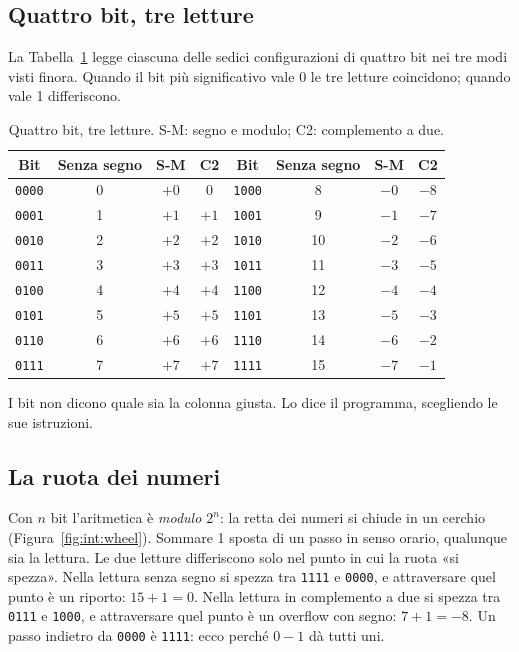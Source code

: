 \subsection{Quattro bit, tre letture}

La Tabella~\ref{tab:int:readings} legge ciascuna delle sedici configurazioni di
quattro bit nei tre modi visti finora. Quando il bit più significativo vale 0
le tre letture coincidono; quando vale 1 differiscono.

\begin{table}[htb]
\centering\small
\caption{Quattro bit, tre letture. S-M: segno e modulo; C2: complemento a due.}\label{tab:int:readings}
\begin{tabular}{@{}cccc@{\qquad}cccc@{}}
\toprule
\textbf{Bit} & \textbf{Senza segno} & \textbf{S-M} & \textbf{C2} &
\textbf{Bit} & \textbf{Senza segno} & \textbf{S-M} & \textbf{C2}\\
\midrule
\texttt{0000} & 0 & $+0$ & 0 & \texttt{1000} & 8 & $-0$ & $-8$\\
\texttt{0001} & 1 & $+1$ & $+1$ & \texttt{1001} & 9 & $-1$ & $-7$\\
\texttt{0010} & 2 & $+2$ & $+2$ & \texttt{1010} & 10 & $-2$ & $-6$\\
\texttt{0011} & 3 & $+3$ & $+3$ & \texttt{1011} & 11 & $-3$ & $-5$\\
\texttt{0100} & 4 & $+4$ & $+4$ & \texttt{1100} & 12 & $-4$ & $-4$\\
\texttt{0101} & 5 & $+5$ & $+5$ & \texttt{1101} & 13 & $-5$ & $-3$\\
\texttt{0110} & 6 & $+6$ & $+6$ & \texttt{1110} & 14 & $-6$ & $-2$\\
\texttt{0111} & 7 & $+7$ & $+7$ & \texttt{1111} & 15 & $-7$ & $-1$\\
\bottomrule
\end{tabular}
\end{table}

\begin{prgconcept}
I bit non dicono quale sia la colonna giusta. Lo dice il programma, scegliendo
le sue istruzioni.
\end{prgconcept}

\subsection{La ruota dei numeri}

Con $n$ bit l'aritmetica è \emph{modulo $2^{n}$}: la retta dei numeri si chiude
in un cerchio (Figura~\ref{fig:int:wheel}). Sommare 1 sposta di un passo in
senso orario, qualunque sia la lettura. Le due letture differiscono solo nel
punto in cui la ruota «si spezza». Nella lettura senza segno si spezza tra
\texttt{1111} e \texttt{0000}, e attraversare quel punto è un riporto:
$15+1=0$. Nella lettura in complemento a due si spezza tra \texttt{0111} e
\texttt{1000}, e attraversare quel punto è un overflow con segno: $7+1=-8$. Un
passo indietro da \texttt{0000} è \texttt{1111}: ecco perché $0-1$ dà tutti
uni.

